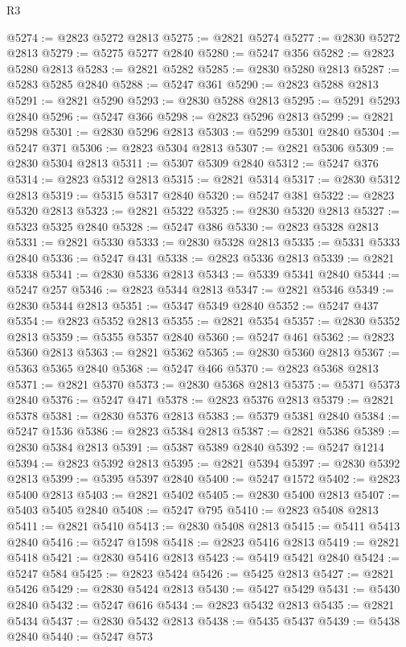 \begin{lexlean}{R3}
\begin{coremodule}
@5274 := @2823 @5272 @2813
@5275 := @2821 @5274
@5277 := @2830 @5272 @2813
@5279 := @5275 @5277 @2840
@5280 := @5247 @356
@5282 := @2823 @5280 @2813
@5283 := @2821 @5282
@5285 := @2830 @5280 @2813
@5287 := @5283 @5285 @2840
@5288 := @5247 @361
@5290 := @2823 @5288 @2813
@5291 := @2821 @5290
@5293 := @2830 @5288 @2813
@5295 := @5291 @5293 @2840
@5296 := @5247 @366
@5298 := @2823 @5296 @2813
@5299 := @2821 @5298
@5301 := @2830 @5296 @2813
@5303 := @5299 @5301 @2840
@5304 := @5247 @371
@5306 := @2823 @5304 @2813
@5307 := @2821 @5306
@5309 := @2830 @5304 @2813
@5311 := @5307 @5309 @2840
@5312 := @5247 @376
@5314 := @2823 @5312 @2813
@5315 := @2821 @5314
@5317 := @2830 @5312 @2813
@5319 := @5315 @5317 @2840
@5320 := @5247 @381
@5322 := @2823 @5320 @2813
@5323 := @2821 @5322
@5325 := @2830 @5320 @2813
@5327 := @5323 @5325 @2840
@5328 := @5247 @386
@5330 := @2823 @5328 @2813
@5331 := @2821 @5330
@5333 := @2830 @5328 @2813
@5335 := @5331 @5333 @2840
@5336 := @5247 @431
@5338 := @2823 @5336 @2813
@5339 := @2821 @5338
@5341 := @2830 @5336 @2813
@5343 := @5339 @5341 @2840
@5344 := @5247 @257
@5346 := @2823 @5344 @2813
@5347 := @2821 @5346
@5349 := @2830 @5344 @2813
@5351 := @5347 @5349 @2840
@5352 := @5247 @437
@5354 := @2823 @5352 @2813
@5355 := @2821 @5354
@5357 := @2830 @5352 @2813
@5359 := @5355 @5357 @2840
@5360 := @5247 @461
@5362 := @2823 @5360 @2813
@5363 := @2821 @5362
@5365 := @2830 @5360 @2813
@5367 := @5363 @5365 @2840
@5368 := @5247 @466
@5370 := @2823 @5368 @2813
@5371 := @2821 @5370
@5373 := @2830 @5368 @2813
@5375 := @5371 @5373 @2840
@5376 := @5247 @471
@5378 := @2823 @5376 @2813
@5379 := @2821 @5378
@5381 := @2830 @5376 @2813
@5383 := @5379 @5381 @2840
@5384 := @5247 @1536
@5386 := @2823 @5384 @2813
@5387 := @2821 @5386
@5389 := @2830 @5384 @2813
@5391 := @5387 @5389 @2840
@5392 := @5247 @1214
@5394 := @2823 @5392 @2813
@5395 := @2821 @5394
@5397 := @2830 @5392 @2813
@5399 := @5395 @5397 @2840
@5400 := @5247 @1572
@5402 := @2823 @5400 @2813
@5403 := @2821 @5402
@5405 := @2830 @5400 @2813
@5407 := @5403 @5405 @2840
@5408 := @5247 @795
@5410 := @2823 @5408 @2813
@5411 := @2821 @5410
@5413 := @2830 @5408 @2813
@5415 := @5411 @5413 @2840
@5416 := @5247 @1598
@5418 := @2823 @5416 @2813
@5419 := @2821 @5418
@5421 := @2830 @5416 @2813
@5423 := @5419 @5421 @2840
@5424 := @5247 @584
@5425 := @2823 @5424
@5426 := @5425 @2813
@5427 := @2821 @5426
@5429 := @2830 @5424 @2813
@5430 := @5427 @5429
@5431 := @5430 @2840
@5432 := @5247 @616
@5434 := @2823 @5432 @2813
@5435 := @2821 @5434
@5437 := @2830 @5432 @2813
@5438 := @5435 @5437
@5439 := @5438 @2840
@5440 := @5247 @573

\end{coremodule}
\end{lexlean}
